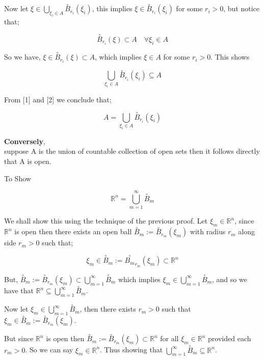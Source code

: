 \documentclass{article}
\begin{document}
Now let $\xi \in \bigcup_{\xi_{i} \in A} \stackrel{\circ}{B}_{r_{i}}\left(\xi_{i}\right)$, this implies $\xi \in \stackrel{\circ}{B}_{r_{i}}\left(\xi_{i}\right)$ for some $r_{i}>0$, but notice that;

$$
\stackrel{\circ}{B}_{r_{i}}(\xi) \subset A \quad \forall \xi_{i} \in A
$$

So we have, $\xi \in \stackrel{\circ}{B}_{r_{i}}(\xi) \subset A$, which implies $\xi \in A$ for some $r_{i}>0$. This shows

\begin{equation}
\bigcup_{\xi_{i} \in A} \stackrel{\circ}{B}_{r_{i}}\left(\xi_{i}\right) \subseteq A\tag{2}
\end{equation}

From [1] and [2] we conclude that;

$$
A=\bigcup_{\xi_{i} \in A} \stackrel{\circ}{B}_{r_{i}}\left(\xi_{i}\right)
$$
\newpage

\textbf{Conversely},\\

suppose A is the union of countable collection of open sets then it follows directly that $\mathrm{A}$ is open.

To Show

$$
\mathbb{R}^{n}=\bigcup_{m=1}^{\infty} \stackrel{\circ}{B}_{m}
$$

We shall show this using the technique of the previous proof. Let $\xi_{m} \in \mathbb{R}^{n}$, since $\mathbb{R}^{n}$ is open then there exists an open ball $\stackrel{\circ}{B}_{m}:=\stackrel{\circ}{B}_{r_{m}}\left(\xi_{m}\right)$ with radius $r_{m}$ along side $r_{m}>0$ such that;

$$
\xi_{m} \in \stackrel{\circ}{B}_{m}:={\stackrel{\circ}{B_{m}}}_{r_{m}}\left(\xi_{m}\right) \subset \mathbb{R}^{n}
$$

But, $\stackrel{\circ}{B}_{m}:=\stackrel{\circ}{B}_{r_{m}}\left(\xi_{m}\right) \subset \bigcup_{m=1}^{\infty} \stackrel{\circ}{B}_{m}$ which implies $\xi_{m} \in \bigcup_{m=1}^{\infty} \stackrel{\circ}{B}_{m}$, and so we have that $\mathbb{R}^{n} \subseteq \bigcup_{m=1}^{\infty} \stackrel{\circ}{B}_{m}$.

Now let $\xi_{m} \in \bigcup_{m=1}^{\infty} \stackrel{\circ}{B}_{m}$, then there exists $r_{m}>0$ such that $\xi_{m} \in \stackrel{\circ}{B}_{m}:=\stackrel{\circ}{B}_{r_{m}}\left(\xi_{m}\right)$.

But since $\mathbb{R}^{n}$ is open then $\stackrel{\circ}{B}_{m}:=\stackrel{\circ}{B}_{r_{m}}\left(\xi_{m}\right) \subset \mathbb{R}^{n}$ for all $\xi_{m} \in \mathbb{R}^{n}$ provided each $r_{m}>0$. So we can say $\xi_{m} \in \mathbb{R}^{n}$. Thus showing that $\bigcup_{m=1}^{\infty} \stackrel{\circ}{B}_{m} \subseteq \mathbb{R}^{n}$.
\end{document}
